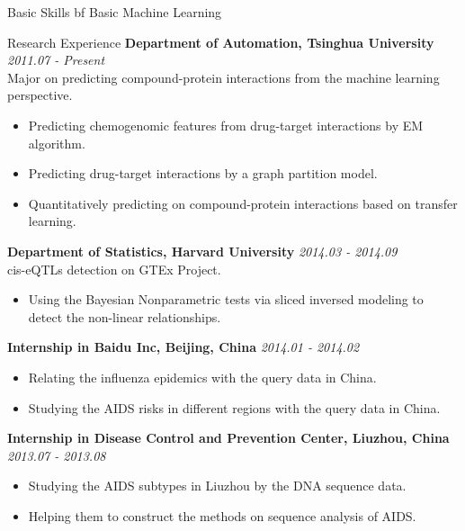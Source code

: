 \documentclass{resume} %
\begin{document}
\begin{rSection}{Basic Skills}
  {bf Basic Machine Learning }\\
  \vspace{-3mm}
  \begin{itemize}
  \end{itemize}
  
\end{rSection}

\begin{rSection}{Research Experience}
{\bf Department of Automation, Tsinghua University} \hfill {\em 2011.07 - Present}\\
Major on predicting compound-protein interactions from the machine learning perspective.
\vspace{-3mm}
\begin{itemize}
\item Predicting chemogenomic features from drug-target interactions by EM algorithm.
\item Predicting drug-target interactions by a graph partition model.
\item Quantitatively predicting on compound-protein interactions based on transfer learning.
\end{itemize}
{\bf Department of Statistics, Harvard University} \hfill {\em 2014.03 - 2014.09} \\
cis-eQTLs detection on GTEx Project.
\vspace{-3mm}
\begin{itemize}
\item Using the Bayesian Nonparametric tests via sliced inversed modeling to detect the non-linear relationships.
\end{itemize}
{\bf Internship in Baidu Inc, Beijing, China} \hfill {\em 2014.01 - 2014.02}
\vspace{-3mm}
\begin{itemize}
\item  Relating the influenza epidemics with the query data in China.
\item  Studying the AIDS risks in different regions with the query data in China.
\end{itemize}
{\bf Internship in Disease Control and Prevention Center, Liuzhou, China} \hfill {\em 2013.07 - 2013.08}
\vspace{-3mm}
\begin{itemize}
\item Studying the AIDS subtypes in Liuzhou by the DNA sequence data.
\item Helping them to construct the methods on sequence analysis of AIDS. 
\end{itemize}
\end{rSection}
\end{document}
